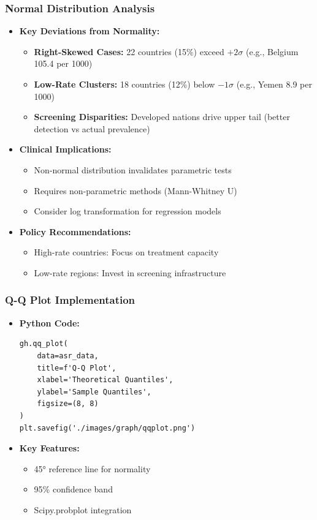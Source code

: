\begin{frame}
    \frametitle{Normal Distribution Analysis}   
    \begin{itemize}
        \item \textbf{Key Deviations from Normality:}
        \begin{itemize}
            \item \textbf{Right-Skewed Cases:} 22 countries (15\%) exceed $+2\sigma$ (e.g., Belgium 105.4 per 1000)
            \item \textbf{Low-Rate Clusters:} 18 countries (12\%) below $-1\sigma$ (e.g., Yemen 8.9 per 1000)
            \item \textbf{Screening Disparities:} Developed nations drive upper tail (better detection vs actual prevalence)
        \end{itemize}
        
        \item \textbf{Clinical Implications:}
        \begin{itemize}
            \item Non-normal distribution invalidates parametric tests
            \item Requires non-parametric methods (Mann-Whitney U)
            \item Consider log transformation for regression models
        \end{itemize}
        
        \item \textbf{Policy Recommendations:}
        \begin{itemize}
            \item High-rate countries: Focus on treatment capacity
            \item Low-rate regions: Invest in screening infrastructure
        \end{itemize}
    \end{itemize}
\end{frame}

\begin{frame}[fragile]
    \frametitle{Q-Q Plot Implementation}
    \begin{itemize}
        \item \textbf{Python Code:}
        \begin{lstlisting}
gh.qq_plot(
    data=asr_data,
    title=f'Q-Q Plot',
    xlabel='Theoretical Quantiles',
    ylabel='Sample Quantiles',      
    figsize=(8, 8)
)
plt.savefig('./images/graph/qqplot.png')
        \end{lstlisting}
        
        \item \textbf{Key Features:}
        \begin{itemize}
            \item 45° reference line for normality
            \item 95\% confidence band
            \item Scipy.probplot integration
        \end{itemize}
    \end{itemize}
\end{frame}

